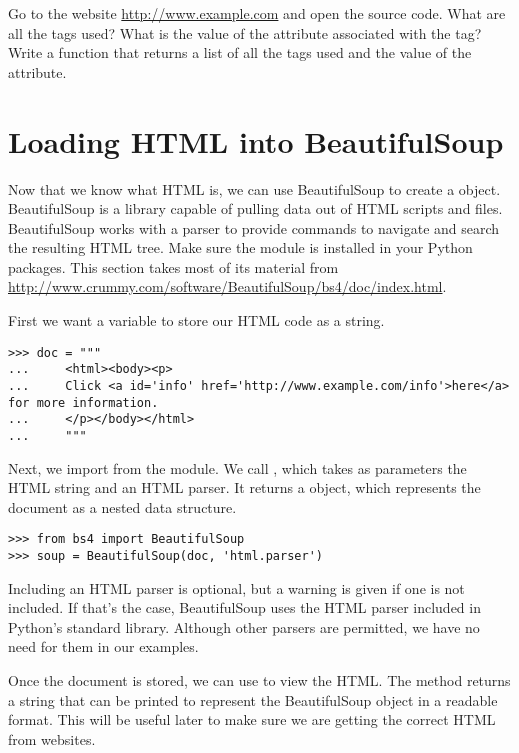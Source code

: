 \begin{problem}
Go to the website \url{http://www.example.com} and open the source code.
What are all the tags used?
What is the value of the  attribute associated with the  tag?
Write a function that returns a list of all the tags used and the value of the  attribute.
\end{problem}

\section*{Loading HTML into BeautifulSoup}
Now that we know what HTML is, we can use BeautifulSoup to create a  object.
BeautifulSoup is a library capable of pulling data out of HTML scripts and files. BeautifulSoup works with a parser to provide commands to navigate and search the resulting HTML tree.
Make sure the module  is installed in your Python packages.
This section takes most of its material from \url{http://www.crummy.com/software/BeautifulSoup/bs4/doc/index.html}.

First we want a variable to store our HTML code as a string.
\begin{lstlisting}
>>> doc = """
...     <html><body><p>
...     Click <a id='info' href='http://www.example.com/info'>here</a> for more information.
...     </p></body></html>
...     """
\end{lstlisting}

Next, we import  from the  module.
We call , which takes as parameters the HTML string and an HTML parser.
It returns a  object, which represents the document as a nested data structure.
\begin{lstlisting}
>>> from bs4 import BeautifulSoup
>>> soup = BeautifulSoup(doc, 'html.parser')
\end{lstlisting}

Including an HTML parser is optional, but a warning is given if one is not included.
If that's the case, BeautifulSoup uses the HTML parser included in Python's standard library.
Although other parsers are permitted, we have no need for them in our examples.

Once the document is stored, we can use  to view the HTML.
The  method returns a string that can be printed to represent the BeautifulSoup object in a readable format.
This will be useful later to make sure we are getting the correct HTML from websites.

